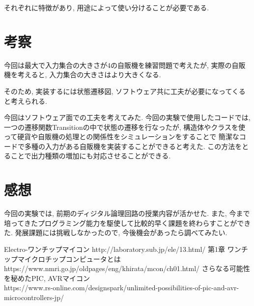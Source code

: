\documentclass[titlepage]{jsarticle}
\begin{document}
    それぞれに特徴があり, 用途によって使い分けることが必要である.

\section{考察}
    今回は最大で入力集合の大きさが4の自販機を練習問題で考えたが,
    実際の自販機を考えると, 入力集合の大きさはより大きくなる.

    そのため, 実装するには状態遷移図, ソフトウェア共に工夫が必要になってくると考えられる.

    今回はソフトウェア面での工夫を考えてみた.
    今回の実験で使用したコードでは, 一つの遷移関数Transitionの中で状態の遷移を行なったが, 
    構造体やクラスを使って硬貨や自販機の処理との関係性をシミュレーションをすることで
    簡潔なコードで多種の入力がある自販機を実装することができると考えた.
    この方法をとることで出力種類の増加にも対応させることができる.

\section{感想}
    今回の実験では, 前期のディジタル論理回路の授業内容が活かせた.
    また, 今まで培ってきたプログラミング能力を駆使して比較的早く課題を終わらすことができた.
    発展課題には挑戦しなかったので, 今後機会があったら調べてみたい.

\begin{thebibliography}{99}
     Electro-ワンチップマイコン http://laboratory.sub.jp/ele/13.html/
     第1章 ワンチップマイクロチップコンピュータとは \\
        https://www.nmri.go.jp/oldpages/eng/khirata/mcon/ch01.html/
     さらなる可能性を秘めたPIC, AVRマイコン \\
        https://www.rs-online.com/designspark/unlimited-possibilities-of-pic-and-avr-microcontrollers-jp/
\end{thebibliography}
\end{document}
